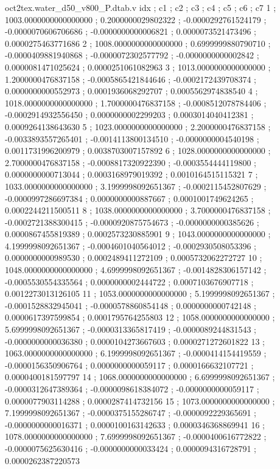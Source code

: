 \begin{filecontents}[overwrite]{oct2tex.water_d50_v800_P.dtab.v}
idx ; c1 ; c2 ; c3 ; c4 ; c5 ; c6 ; c7
1 ; 1003.0000000000000000 ; 0.2000000029802322 ; -0.0000292761524179 ; -0.0000070606706686 ; -0.0000000000006821 ; 0.0000073521473496 ; 0.0000275463771686
2 ; 1008.0000000000000000 ; 0.6999999880790710 ; -0.0000409881940868 ; -0.0000072302577792 ; -0.0000000000002842 ; 0.0000081471025624 ; 0.0000251061082963
3 ; 1013.0000000000000000 ; 1.2000000476837158 ; -0.0005865421844646 ; -0.0002172439708374 ; 0.0000000000552973 ; 0.0001936068292707 ; 0.0005562974838540
4 ; 1018.0000000000000000 ; 1.7000000476837158 ; -0.0008512078784406 ; -0.0002914932556450 ; 0.0000000002299203 ; 0.0003014040412381 ; 0.0009264138643630
5 ; 1023.0000000000000000 ; 2.2000000476837158 ; -0.0033893557265401 ; -0.0014113800134510 ; -0.0000000004540198 ; 0.0011731996200979 ; 0.0038703007157892
6 ; 1028.0000000000000000 ; 2.7000000476837158 ; -0.0008817320922390 ; -0.0003554444119800 ; 0.0000000000713044 ; 0.0003168979019392 ; 0.0010164515115321
7 ; 1033.0000000000000000 ; 3.1999998092651367 ; -0.0002115452807629 ; -0.0000997286697384 ; 0.0000000000887667 ; 0.0001001749624265 ; 0.0002244211500511
8 ; 1038.0000000000000000 ; 3.7000000476837158 ; -0.0002721388300415 ; -0.0000920875754673 ; -0.0000000000385626 ; 0.0000867455819389 ; 0.0002573230885901
9 ; 1043.0000000000000000 ; 4.1999998092651367 ; -0.0004601040564012 ; -0.0002930508053396 ; 0.0000000000989530 ; 0.0002489411272109 ; 0.0005732062272727
10 ; 1048.0000000000000000 ; 4.6999998092651367 ; -0.0014828306157142 ; -0.0005530554335564 ; 0.0000000002444722 ; 0.0007103676907718 ; 0.0012273013126105
11 ; 1053.0000000000000000 ; 5.1999998092651367 ; -0.0001528832945041 ; -0.0000578860854148 ; 0.0000000000742148 ; 0.0000617397599854 ; 0.0001795764255803
12 ; 1058.0000000000000000 ; 5.6999998092651367 ; -0.0000313365817419 ; -0.0000089244831543 ; -0.0000000000036380 ; 0.0000104273667603 ; 0.0000271272601822
13 ; 1063.0000000000000000 ; 6.1999998092651367 ; -0.0000414154419559 ; -0.0000156350906764 ; 0.0000000000059117 ; 0.0000166632107721 ; 0.0000400181597797
14 ; 1068.0000000000000000 ; 6.6999998092651367 ; -0.0000312647389364 ; -0.0000098618384072 ; -0.0000000000059117 ; 0.0000077903114288 ; 0.0000287414732156
15 ; 1073.0000000000000000 ; 7.1999998092651367 ; -0.0000375155286747 ; -0.0000092229365691 ; -0.0000000000016371 ; 0.0000100163142633 ; 0.0000346368869941
16 ; 1078.0000000000000000 ; 7.6999998092651367 ; -0.0000400616772822 ; -0.0000075625630416 ; -0.0000000000033424 ; 0.0000094316728791 ; 0.0000262387220573

\end{filecontents}
